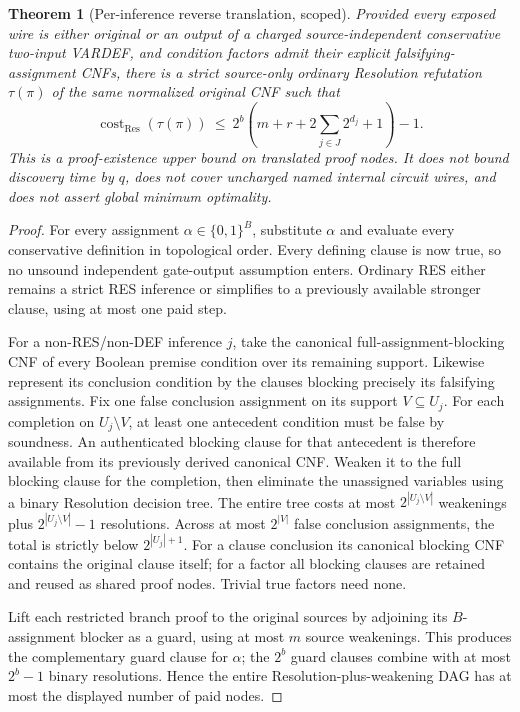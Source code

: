\documentclass[11pt]{article}
\newtheorem{theorem}{Theorem}
\begin{document}
\begin{theorem}[Per-inference reverse translation, scoped]\label{thm:compiler}
Provided every exposed wire is either original or an output of a charged source-independent conservative two-input VARDEF, and condition factors admit their explicit falsifying-assignment CNFs, there is a strict source-only ordinary Resolution refutation $\tau(\pi)$ of the \emph{same} normalized original CNF such that
\[
\boxed{
\operatorname{cost}_{\mathrm{Res}}(\tau(\pi))
\ \le\
2^b\left(m+r+2\sum_{j\in J}2^{d_j}+1\right)-1 .
}
\tag{1}
\]
This is a proof-existence \emph{upper} bound on translated proof nodes. It does not bound discovery time by $q$, does not cover uncharged named internal circuit wires, and does not assert global minimum optimality.
\end{theorem}
\begin{proof}
For every assignment $\alpha\in\{0,1\}^B$, substitute $\alpha$ and evaluate every conservative definition in topological order. Every defining clause is now true, so no unsound independent gate-output assumption enters. Ordinary RES either remains a strict RES inference or simplifies to a previously available stronger clause, using at most one paid step.

For a non-RES/non-DEF inference $j$, take the canonical full-assignment-blocking CNF of every Boolean premise condition over its remaining support. Likewise represent its conclusion condition by the clauses blocking precisely its falsifying assignments. Fix one false conclusion assignment on its support $V\subseteq U_j$. For each completion on $U_j\setminus V$, at least one antecedent condition must be false by soundness. An authenticated blocking clause for that antecedent is therefore available from its previously derived canonical CNF. Weaken it to the full blocking clause for the completion, then eliminate the unassigned variables using a binary Resolution decision tree. The entire tree costs at most $2^{|U_j\setminus V|}$ weakenings plus $2^{|U_j\setminus V|}-1$ resolutions. Across at most $2^{|V|}$ false conclusion assignments, the total is strictly below $2^{|U_j|+1}$. For a clause conclusion its canonical blocking CNF contains the original clause itself; for a factor all blocking clauses are retained and reused as shared proof nodes. Trivial true factors need none.

Lift each restricted branch proof to the original sources by adjoining its $B$-assignment blocker as a guard, using at most $m$ source weakenings. This produces the complementary guard clause for $\alpha$; the $2^b$ guard clauses combine with at most $2^b-1$ binary resolutions. Hence the entire Resolution-plus-weakening DAG has at most the displayed number of paid nodes.


\end{proof}
\end{document}
